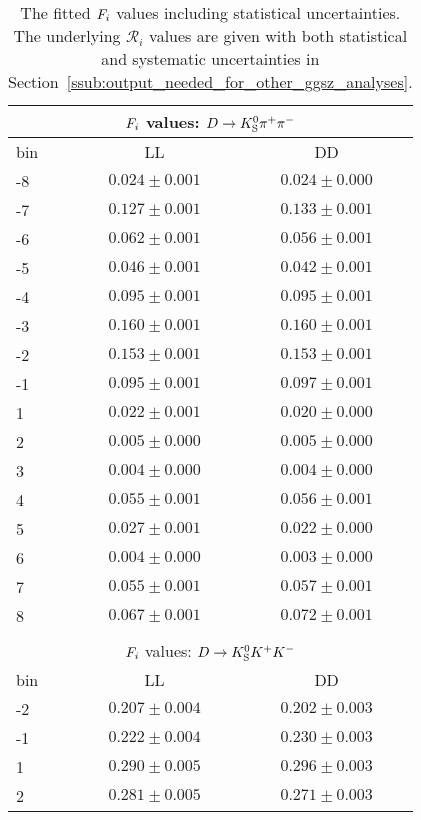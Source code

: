 \begin{table}
\centering

\caption{The fitted $F_i$ values including statistical uncertainties. The underlying $\mathcal R_i$ values are given with both statistical and systematic uncertainties in Section~\ref{ssub:output_needed_for_other_ggsz_analyses}.
\label{tab:Fi_values}
}

\begin{tabular}{lcc}
\toprule
\multicolumn{3}{c}{$F_i$ values: $D\rightarrow{\ensuremath{{K}^0_{\mathrm{S}}}}{\ensuremath{{\pi}^+}}{\ensuremath{{\pi}^-}}$}\\
\midrule
bin &                 LL &                 DD \\
\midrule
-8  &  $0.024 \pm 0.001$ &  $0.024 \pm 0.000$ \\
-7  &  $0.127 \pm 0.001$ &  $0.133 \pm 0.001$ \\
-6  &  $0.062 \pm 0.001$ &  $0.056 \pm 0.001$ \\
-5  &  $0.046 \pm 0.001$ &  $0.042 \pm 0.001$ \\
-4  &  $0.095 \pm 0.001$ &  $0.095 \pm 0.001$ \\
-3  &  $0.160 \pm 0.001$ &  $0.160 \pm 0.001$ \\
-2  &  $0.153 \pm 0.001$ &  $0.153 \pm 0.001$ \\
-1  &  $0.095 \pm 0.001$ &  $0.097 \pm 0.001$ \\
 1  &  $0.022 \pm 0.001$ &  $0.020 \pm 0.000$ \\
 2  &  $0.005 \pm 0.000$ &  $0.005 \pm 0.000$ \\
 3  &  $0.004 \pm 0.000$ &  $0.004 \pm 0.000$ \\
 4  &  $0.055 \pm 0.001$ &  $0.056 \pm 0.001$ \\
 5  &  $0.027 \pm 0.001$ &  $0.022 \pm 0.000$ \\
 6  &  $0.004 \pm 0.000$ &  $0.003 \pm 0.000$ \\
 7  &  $0.055 \pm 0.001$ &  $0.057 \pm 0.001$ \\
 8  &  $0.067 \pm 0.001$ &  $0.072 \pm 0.001$ \\
\midrule \\

\multicolumn{3}{c}{$F_i$ values: $D\rightarrow{\ensuremath{{K}^0_{\mathrm{S}}}}{\ensuremath{{K}^+}}{\ensuremath{{K}^-}}$}\\

\midrule
bin &                 LL &                 DD \\
\midrule
-2  &  $0.207 \pm 0.004$ &  $0.202 \pm 0.003$ \\
-1  &  $0.222 \pm 0.004$ &  $0.230 \pm 0.003$ \\
 1  &  $0.290 \pm 0.005$ &  $0.296 \pm 0.003$ \\
 2  &  $0.281 \pm 0.005$ &  $0.271 \pm 0.003$ \\
\bottomrule
\end{tabular}
\end{table}
